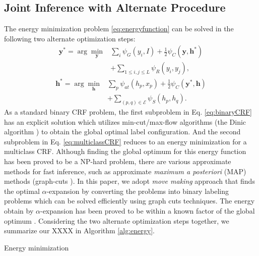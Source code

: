 \subsection{Joint Inference with Alternate Procedure}
The energy minimization problem \eqref{eq:energyfunction} can be solved in the following two alternate optimization steps:
\begin{equation}
    \label{eq:binaryCRF}
    \begin{aligned}
        \boldsymbol{y}^* = \arg\min_{\boldsymbol{y}} &\sum_{i} {\psi_{G}(y_i,I)} + \frac{1}{2} \psi_{C}(\boldsymbol{y},\boldsymbol{h}^*) \\ &+ \sum_{1 \le i,j \le L} {\psi_{R}(y_i,y_j)}, 
    \end{aligned}
\end{equation}
\begin{equation}
    \label{eq:multiclassCRF}
    \begin{aligned}
        \boldsymbol{h}^* = \arg\min_{\boldsymbol{h}} &\sum_{p} {\psi_{at}(h_p,x_p)} + \frac{1}{2} \psi_{C}(\boldsymbol{y}^*,\boldsymbol{h}) \\ &+ \sum_{(p,q) \in \mathcal{E}}{\psi_{S}(h_p,h_q)}.
    \end{aligned}
\end{equation}
As a standard binary CRF problem, the first subproblem in Eq. \eqref{eq:binaryCRF} has an explicit solution which utilizes min-cut/max-flow algorithms (\eg the Dinic algorithm \cite{dinits1970algorithm}) to obtain the global optimal label configuration. And the second subproblem in Eq. \eqref{eq:multiclassCRF} reduces to an energy minimization for a multiclass CRF. Although finding the global optimum for this energy function has been proved to be a NP-hard problem, there are various approximate methods for fast inference, such as approximate \textit{maximum a posteriori} (MAP) methods (\eg graph-cuts \cite{boykov2001fast}). In this paper, we adopt \textit{move making} approach \cite{boykov2001fast} that finds the optimal $\alpha$-expansion \cite{boykov2001fast,kolmogorov2004energy} by converting the problems into binary labeling  problems which can be solved efficiently using graph cuts techniques. The energy obtain by $\alpha$-expansion has been proved to be within a known factor of the global optimum \cite{boykov2001fast}. Considering the two alternate optimization steps together, we summarize our XXXX in Algorithm \ref{alg:energy}.


\begin{algorithm}[htb]
    \caption{ Energy minimization }
    \label{alg:energy}
    \begin{algorithmic}[1]
    \end{algorithmic}
\end{algorithm}



